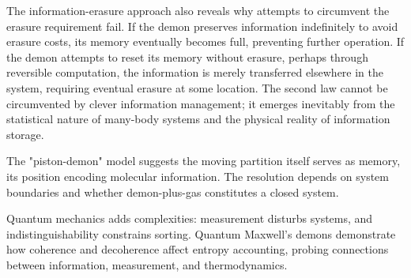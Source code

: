 The information-erasure approach also reveals why attempts to circumvent the erasure requirement fail. If the demon preserves information indefinitely to avoid erasure costs, its memory eventually becomes full, preventing further operation. If the demon attempts to reset its memory without erasure, perhaps through reversible computation, the information is merely transferred elsewhere in the system, requiring eventual erasure at some location. The second law cannot be circumvented by clever information management; it emerges inevitably from the statistical nature of many-body systems and the physical reality of information storage.

The "piston-demon" model suggests the moving partition itself serves as memory, its position encoding molecular information. The resolution depends on system boundaries and whether demon-plus-gas constitutes a closed system.

Quantum mechanics adds complexities: measurement disturbs systems, and indistinguishability constrains sorting. Quantum Maxwell's demons demonstrate how coherence and decoherence affect entropy accounting, probing connections between information, measurement, and thermodynamics.